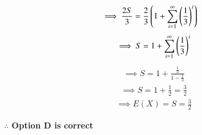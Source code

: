 \documentclass[journal,12pt,twocolumn]{IEEEtran}
\begin{document}
  \begin{align}
     \implies \frac{2S}{3}&=\frac{2}{3}\left(
     1+\sum_{i=1}^{\infty}\left(\frac{1}{3}\right)^{i}\right)
  \end{align}
  \begin{align}
     \implies S=1+\sum_{i=1}^{\infty}\left(\frac{1}{3}\right)^{i}
  \end{align}
  \begin{align}
     \implies S=1+\frac{\frac{1}{3}}{1-\frac{1}{3}}
  \end{align}
  \begin{align}
     \implies S=1+\frac{1}{2}=\frac{3}{2}
  \end{align}
  \begin{align}
     \implies E(X)=S=\frac{3}{2}
  \end{align}
  \begin{center}
  \textbf{$\therefore$ Option D is correct}    
  \end{center}
\end{document}
